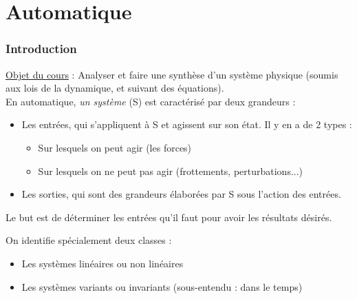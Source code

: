 \part{Automatique}
\section{Introduction}
\underline{Objet du cours} : Analyser et faire une synthèse d'un système physique (soumis aux lois de la dynamique, et suivant des équations).\\
En automatique, \textit{un système} (S) est caractérisé par deux grandeurs :
\begin{itemize}
	\item Les entrées, qui s'appliquent à S et agissent sur son état. Il y en a de 2 types : 
		\begin{itemize}
			\item Sur lesquels on peut agir (les forces)
			\item Sur lesquels on ne peut pas agir (frottements, perturbations...)
		\end{itemize}
	\item Les sorties, qui sont des grandeurs élaborées par S sous l'action des entrées.
\end{itemize}

\bigskip
Le but est de déterminer les entrées qu'il faut pour avoir les résultats désirés. 


On identifie spécialement deux classes :
\begin{itemize}
	\item Les systèmes linéaires ou non linéaires
	\item Les systèmes variants ou invariants (sous-entendu : dans le temps)
\end{itemize}

